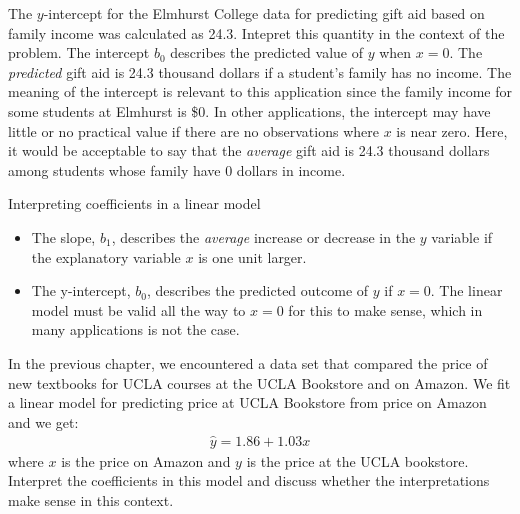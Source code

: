 \begin{examplewrap}
\begin{nexample}{The $y$-intercept for the Elmhurst College data for predicting gift aid based on family income was calculated as 24.3.  Intepret this quantity in the context of the problem. }
The intercept $b_0$ describes the predicted value of $y$ when $x=0$.  The \emph{predicted} gift aid is 24.3 thousand dollars if a student's family has no income.  The meaning of the intercept is relevant to this application since the family income for some students at Elmhurst is \$0. In other applications, the intercept may have little or no practical value if there are no observations where $x$ is near zero.  Here, it would be acceptable to say that the \emph{average} gift aid is 24.3 thousand dollars among students whose family have 0 dollars in income.
\end{nexample}
\end{examplewrap}

\begin{onebox}{Interpreting coefficients in a linear model}
\vspace{-4mm}
\begin{itemize}
\setlength{\itemsep}{0mm}
\item The slope, $b_1$, describes the \emph{average} increase or decrease in the $y$ variable if the explanatory variable $x$ is one unit larger. 
\item The y-intercept, $b_0$, describes the predicted outcome of $y$ if $x=0$.  The linear model must be valid all the way to $x=0$ for this to make sense, which in many applications is not the case.
\end{itemize}
\end{onebox}


\begin{exercisewrap}
\begin{nexercise}
In the previous chapter, we encountered a data set that compared the price of new textbooks for UCLA courses at the UCLA Bookstore and on Amazon.  We fit a linear model for predicting price at UCLA Bookstore from price on Amazon and we get:  
\begin{align*}
\hat{y} = 1.86 + 1.03x
\end{align*}
where $x$ is the price on Amazon and $y$ is the price at the UCLA bookstore.  Interpret the coefficients in this model and discuss whether the interpretations make sense in this context.\footnotemark
\end{nexercise}
\end{exercisewrap}


